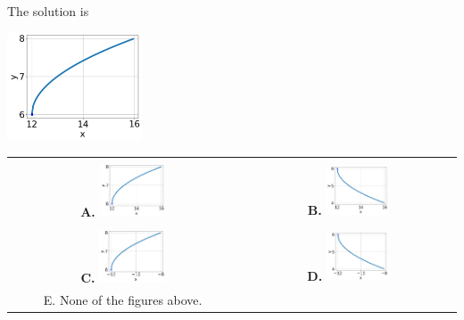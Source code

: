 \documentclass{extbook}[14pt]
\begin{document}
 
 The solution is  
 \begin{center} \includegraphics[width=0.3\textwidth]{../Figures/radicalEquationToGraphAA.png} \end{center}\begin{tabular}{|c|c|} 
\hline 
 & \tabularnewline 
 \textbf{A.} \includegraphics[width=0.3\textwidth]{../Figures/radicalEquationToGraphAA.png} & \textbf{B.} \includegraphics[width=0.3\textwidth]{../Figures/radicalEquationToGraphDA.png} \tabularnewline 
\hline 
 & \tabularnewline 
 \textbf{C.} \includegraphics[width=0.3\textwidth]{../Figures/radicalEquationToGraphBA.png} & \textbf{D.} \includegraphics[width=0.3\textwidth]{../Figures/radicalEquationToGraphCA.png} \tabularnewline 
\hline 
 E. None of the figures above. & \tabularnewline 
\hline 
 \end{tabular} 
 
\end{document}

